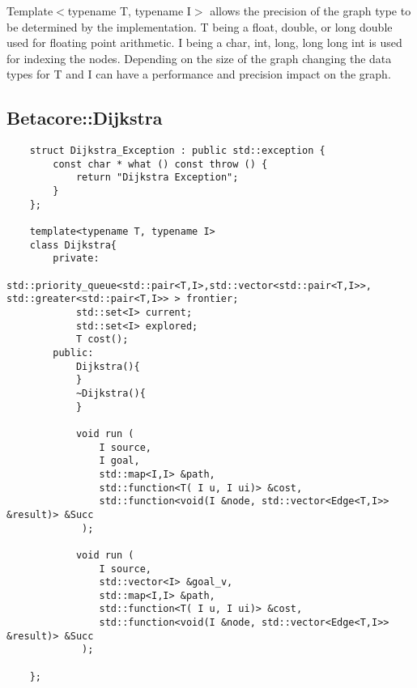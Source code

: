 \documentclass[12pt]{article}
\begin{document}
Template$<$typename T, typename I$>$ allows the precision of the graph type to 
be determined by the implementation. T being a float, double, or long double
used for floating point arithmetic. I being a char, int, long, long long int is
used for indexing the nodes. Depending on the size of the graph changing the 
data types for T and I can have a performance and precision impact on the graph.

\subsection{Betacore::Dijkstra}
\begin{lstlisting}
	struct Dijkstra_Exception : public std::exception {
		const char * what () const throw () {
			return "Dijkstra Exception";
		}
	};

	template<typename T, typename I>
	class Dijkstra{
		private:
			std::priority_queue<std::pair<T,I>,std::vector<std::pair<T,I>>, std::greater<std::pair<T,I>> > frontier;
			std::set<I> current; 
			std::set<I> explored;
			T cost();
		public:
			Dijkstra(){
			}
			~Dijkstra(){
			}
		
			void run (
				I source,
				I goal,
				std::map<I,I> &path,
				std::function<T( I u, I ui)> &cost,
				std::function<void(I &node, std::vector<Edge<T,I>> &result)> &Succ
			 );
		
			void run (
				I source,
				std::vector<I> &goal_v,
				std::map<I,I> &path,
				std::function<T( I u, I ui)> &cost,
				std::function<void(I &node, std::vector<Edge<T,I>> &result)> &Succ
			 );
	
	};
\end{lstlisting}
\end{document}
